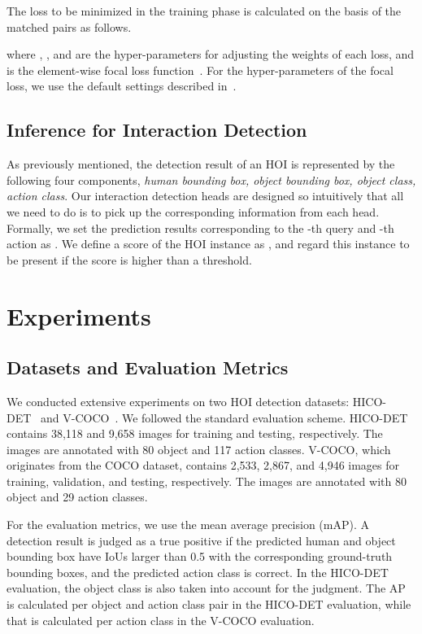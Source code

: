 \documentclass[final]{cvpr}
\begin{document}
The loss to be minimized in the training phase is calculated on the basis of the matched pairs
as follows.

where ,  ,  and  are the hyper-parameters for adjusting the weights of each loss, and  is the element-wise focal loss function~\cite{lin_iccv2017}. 
For the hyper-parameters of the focal loss, we use the default settings described in~\cite{zhou_center_arxiv2019}. 
\subsection{Inference for Interaction Detection}\label{subsec:inference}
As previously mentioned, the detection result of an HOI is represented by the following four components, {\it human bounding box, object bounding box, object class, action class}.
Our interaction detection heads are designed so intuitively that all we need to do is to pick up the corresponding information from each head. 
Formally, we set the prediction results corresponding to the -th query and -th action as .
We define a score of the HOI instance as 
,
and regard this instance to be present if the score is higher than a threshold.

\section{Experiments}
\subsection{Datasets and Evaluation Metrics}
We conducted extensive experiments on two HOI detection datasets: HICO-DET~\cite{chao_wacv2018} and V-COCO~\cite{gupta_arxiv2015}. 
We followed the standard evaluation scheme.
HICO-DET contains 38,118 and 9,658 images for training and testing, respectively. 
The images are annotated with 80 object and 117 action classes.
V-COCO, which originates from the COCO dataset, contains 2,533, 2,867, and 4,946 images for training, validation, and testing, respectively. 
The images are annotated with 80 object and 29 action classes. 

For the evaluation metrics, we use the mean average precision (mAP). 
A detection result is judged as a true positive if the predicted human and object bounding box have IoUs larger than 0.5 with the corresponding ground-truth bounding boxes, and the predicted action class is correct. In the HICO-DET evaluation, the object class is also taken into account for the judgment. The AP is calculated per object and action class pair in the HICO-DET evaluation, while that is calculated per action class in the V-COCO evaluation.
\end{document}

